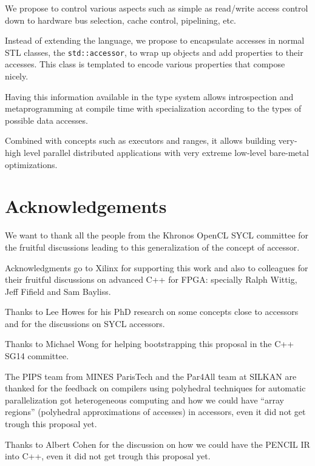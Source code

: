 \documentclass[a4paper]{article}
\begin{document}
We propose to control various aspects such as simple as read/write
access control down to hardware bus selection, cache control,
pipelining, etc.

Instead of extending the language, we propose to encapsulate accesses
in normal STL classes, the \lstinline|std::accessor|, to wrap up
objects and add properties to their accesses. This class is templated
to encode various properties that compose nicely.

Having this information available in the type system allows
introspection and metaprogramming at compile time with specialization
according to the types of possible data accesses.

Combined with concepts such as executors and ranges, it allows
building very-high level parallel distributed applications with very
extreme low-level bare-metal optimizations.


\section*{Acknowledgements}
\label{sec:acknowledgements}

We want to thank all the people from the Khronos OpenCL SYCL committee
for the fruitful discussions leading to this generalization of the
concept of accessor.

Acknowledgments go to Xilinx for supporting this work and also to
colleagues for their fruitful discussions on advanced C++ for FPGA:
specially Ralph Wittig, Jeff Fifield and Sam Bayliss.

Thanks to Lee Howes for his PhD \cite{PhD:Howes2010} research on some
concepts close to accessors and for the discussions on SYCL accessors.

Thanks to Michael Wong for helping bootstrapping this proposal in the
C++ SG14 committee.

The PIPS team from MINES ParisTech and the Par4All team at SILKAN are
thanked for the feedback on compilers using polyhedral techniques for
automatic parallelization got heterogeneous computing and how we could
have ``array regions'' (polyhedral approximations of accesses) in
accessors, even it did not get trough this proposal yet.

Thanks to Albert Cohen for the discussion on how we could have the
PENCIL IR \cite{PENCIL} into C++, even it did not get trough this
proposal yet.




\end{document}
